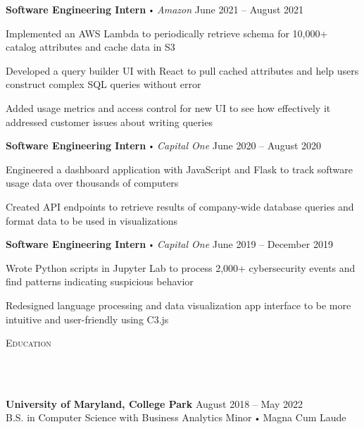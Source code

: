 \documentclass{article}
\newcommand{\header}[1]{{
\hspace*{-15pt}\vspace*{10pt} \large \scshape{#1}} \vspace*{-6pt} 
\lineunder
}
\newcommand{\lineunder}{
\vspace*{-8pt} \\ \hspace*{-18pt} 
\hrulefill \\
}
\newcommand{\school}[4]{
\textbf{#1} #2 \hfill #3 \\ #4 \vspace*{5pt}
}
\newcommand{\employer}[4]{
\textbf{#1} \labelitemi \textit{#2} \hfill #3 \\ #4 \vspace*{3pt}
}
\renewcommand{\labelitemi}{
$\vcenter{\hbox{\tiny$\bullet$}}$\hspace*{3pt}
}
\renewcommand{\labelitemii}{
$\vcenter{\hbox{\tiny$\bullet$}}$\hspace*{-3pt}
}
\newenvironment{bullet-list-minor}{
\begin{list}{\labelitemii}{\setlength\leftmargin{15pt} 
\topsep 0pt \itemsep 1pt}}{\vspace*{4pt}\end{list}
}
\begin{document}
     \employer{Software Engineering Intern}{Amazon}{June  2021 -- August 2021}{}
	\begin{bullet-list-minor}
	\item Implemented an AWS Lambda to periodically retrieve
	schema for 10,000+ catalog attributes and cache data in S3
    \item Developed a query builder UI with React to pull cached attributes and help users construct complex SQL queries without error
    \item Added usage metrics and access control for new UI to see how effectively it addressed customer issues about writing queries
    \end{bullet-list-minor}
    \medskip
    
    \employer{Software Engineering Intern}{Capital One}{June 2020 -- August 2020}{}
	\begin{bullet-list-minor}
	\item Engineered a dashboard  application with JavaScript and Flask to track software usage data over thousands of computers
	\item Created API endpoints to retrieve results of company-wide database queries and format data to be used  in visualizations
    \end{bullet-list-minor}
    \medskip
    
    \employer{Software Engineering Intern}{Capital One}{June 2019 -- December 2019}{}
	\begin{bullet-list-minor}
	\item Wrote Python scripts in Jupyter Lab to process 2,000+  cybersecurity events and find patterns indicating suspicious behavior
	\item Redesigned language processing and data visualization app interface to be more intuitive and user-friendly using C3.js
    \end{bullet-list-minor}
\medskip

\header{Education}
    \vspace{4pt}
    \school{University of Maryland, College Park}{}{August 2018 -- May 2022}{\vspace{4pt}  B.S. in Computer Science with Business Analytics Minor \labelitemi Magna Cum Laude}


\medskip
\end{document}
